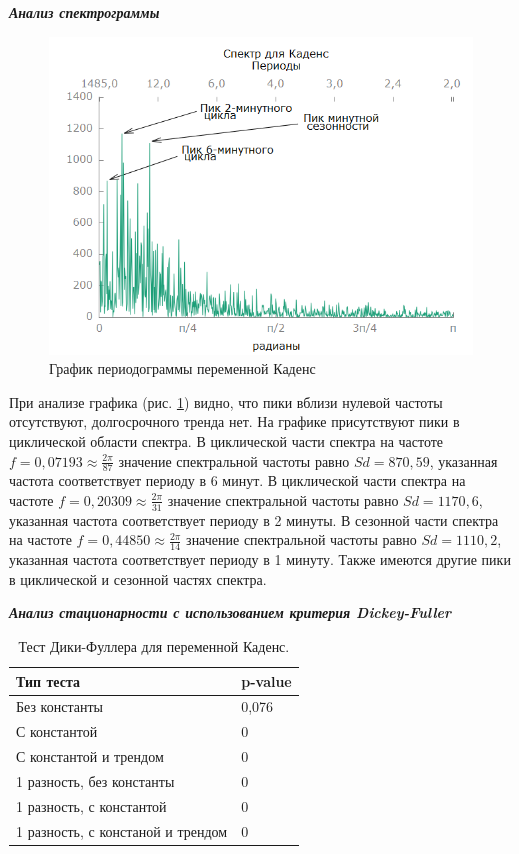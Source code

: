 \documentclass[a4paper,12pt]{article}
\begin{document}
\textbf{\textit{Анализ спектрограммы}}

\begin{figure}[H]
	\centering
	\includegraphics[width=0.5\linewidth]{../[graphics]/cad_spectr}
	\caption{График периодограммы переменной Каденс}
	\label{fig:cad_spectr}
\end{figure}

При анализе графика (рис. \ref{fig:cad_spectr}) видно, что пики вблизи нулевой частоты отсутствуют, долгосрочного тренда нет. На графике присутствуют пики в циклической области спектра. 
В циклической части спектра на частоте $f = 0,07193 \approx \frac{2 \pi}{87}$ значение спектральной частоты равно $Sd = 870,59$, указанная частота соответствует периоду в 6 минут.
В циклической части спектра на частоте $f = 0,20309 \approx \frac{2 \pi}{31}$ значение спектральной частоты равно $Sd = 1170,6$, указанная частота соответствует периоду в 2 минуты.
В сезонной части спектра на частоте $f = 0,44850 \approx \frac{2 \pi}{14}$ значение спектральной частоты равно $Sd = 1110,2$, указанная частота соответствует периоду в 1 минуту.
Также имеются другие пики в циклической и сезонной частях спектра.

\textbf{\textit{Анализ стационарности с использованием критерия Dickey-Fuller}}

\begin{table}[H]
	\begin{center}
		\begin{tabular}{|l|l|}
			\hline
			Тип теста &p-value \\
			\hline
			Без константы &0,076 \\
			\hline
			С константой &0 \\
			\hline
			С константой и трендом &0 \\
			\hline
			1 разность, без константы & 0\\
			\hline
			1 разность, с константой & 0\\
			\hline
			1 разность, с констаной и трендом & 0\\
			\hline
		\end{tabular}
	\end{center}
	\caption{Тест Дики-Фуллера для переменной Каденс.}
	\label{tab:DFcad}
\end{table}
\end{document}
